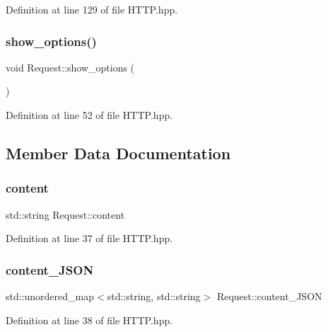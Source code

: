 Definition at line 129 of file H\+T\+T\+P.\+hpp.

\mbox{\label{class_request_ad4a0a5e5d89b7f1289e98e0c29b5239c}} 
\subsubsection{\texorpdfstring{show\+\_\+options()}{show\_options()}}
{\footnotesize\ttfamily void Request\+::show\+\_\+options (\begin{DoxyParamCaption}{ }\end{DoxyParamCaption})}



Definition at line 52 of file H\+T\+T\+P.\+hpp.



\subsection{Member Data Documentation}
\mbox{\label{class_request_a63759662b44d0dbd16ae45a32aca1afd}} 
\subsubsection{\texorpdfstring{content}{content}}
{\footnotesize\ttfamily std\+::string Request\+::content}



Definition at line 37 of file H\+T\+T\+P.\+hpp.

\mbox{\label{class_request_a3fbffd427990b4665f86d9c41676dad9}} 
\subsubsection{\texorpdfstring{content\+\_\+\+J\+S\+ON}{content\_JSON}}
{\footnotesize\ttfamily std\+::unordered\+\_\+map$<$std\+::string, std\+::string$>$ Request\+::content\+\_\+\+J\+S\+ON}



Definition at line 38 of file H\+T\+T\+P.\+hpp.

